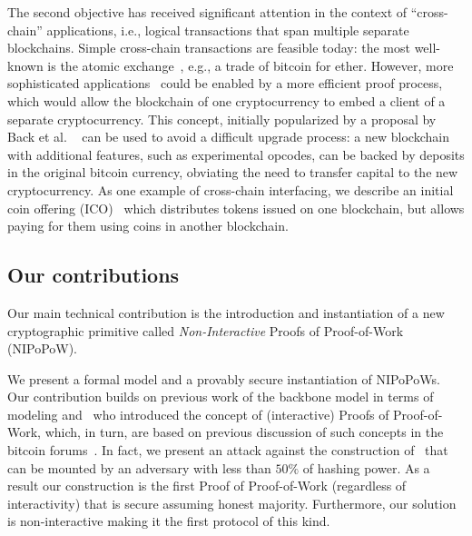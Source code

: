 %
The second objective has received  significant attention in the context of
``cross-chain'' applications, i.e., logical transactions that span multiple
separate blockchains. Simple cross-chain transactions are feasible today: the
most well-known is the atomic exchange~\cite{tiernolan,herlihy2018atomic}, e.g.,
a trade of bitcoin for ether. However, more sophisticated
applications~
\cite{interledger,DBLP:journals/corr/DilleyPWPGF16,
      lerner,drivechains,wood2016polkadot,buchman2016tendermint}
could be enabled by a more efficient proof process, which would allow the
blockchain of one cryptocurrency to embed a client of a separate cryptocurrency.
This concept, initially popularized by a proposal by Back et al.
~\cite{sidechains} can be used to avoid a difficult upgrade process: a new
blockchain with additional features, such as experimental opcodes, can be backed
by deposits in the original bitcoin currency, obviating the need to transfer
capital to the new cryptocurrency. As one example of cross-chain interfacing, we
describe an initial coin offering (ICO)~\cite{ico} which distributes tokens
issued on one blockchain, but allows paying for them using coins in another
blockchain.


\subsection{Our contributions}
Our main technical contribution is the introduction and instantiation of a new
cryptographic primitive called \textit{Non-Interactive} Proofs of Proof-of-Work
(NIPoPoW).

We present a formal model and a provably secure instantiation of NIPoPoWs. Our
contribution builds on previous work of the backbone model \cite{backbone} in
terms of modeling and~\cite{KLS} who introduced the concept of (interactive)
Proofs of Proof-of-Work, which, in turn, are based on previous discussion of
such concepts in the bitcoin forums~\cite{highway}. In fact, we present an
attack against the construction of~\cite{KLS} that can be mounted by an
adversary with less than $50\%$ of hashing power. As a result our construction
is the first Proof of Proof-of-Work (regardless of interactivity) that is secure
assuming honest majority. Furthermore, our solution is non-interactive making it
the first protocol of this kind.

